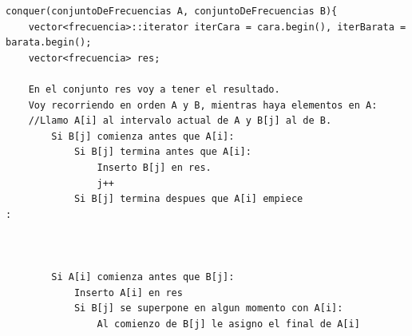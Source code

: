 \documentclass[a4paper]{article}
\begin{document}
	\begin{codesnippet}
	\begin{verbatim}
conquer(conjuntoDeFrecuencias A, conjuntoDeFrecuencias B){
	vector<frecuencia>::iterator iterCara = cara.begin(), iterBarata = barata.begin();
	vector<frecuencia> res;
	
	En el conjunto res voy a tener el resultado.
    Voy recorriendo en orden A y B, mientras haya elementos en A:
    //Llamo A[i] al intervalo actual de A y B[j] al de B.
        Si B[j] comienza antes que A[i]:
            Si B[j] termina antes que A[i]:
                Inserto B[j] en res.
                j++
            Si B[j] termina despues que A[i] empiece                                                                                                                                                                                                                                                                                                                                                                                                                                                                                                                                                                                                                                                                                                                                                                                                                                                                                                                                                                                                                                                                                                                                                                                                                                                                                                                                                              :
                
    
    
        Si A[i] comienza antes que B[j]:
            Inserto A[i] en res
            Si B[j] se superpone en algun momento con A[i]:
                Al comienzo de B[j] le asigno el final de A[i]





\end{verbatim}
\end{codesnippet}
\end{document}
